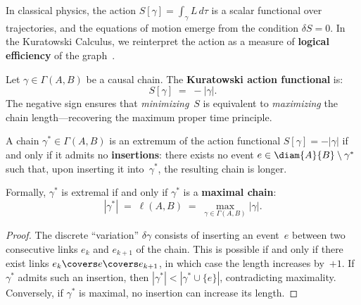 In classical physics, the action
$S[\gamma] = \int_\gamma L\,d\tau$ is a scalar functional over
trajectories, and the equations of motion emerge from the condition
$\delta S = 0$. In the Kuratowski Calculus, we reinterpret the action
as a measure of \textbf{logical efficiency} of the
graph~\cite{benincasa2010,benincasa2011,buck2015}.

\begin{definition}
\label{def:discrete-action}
Let $\gamma \in \Gamma(A,B)$ be a causal chain. The \textbf{Kuratowski
action functional} is:
\begin{equation}
  S[\gamma] \;=\; -|\gamma|.
  \label{eq:discrete-action}
\end{equation}
The negative sign ensures that \emph{minimizing}~$S$ is equivalent to
\emph{maximizing} the chain length---recovering the maximum proper
time principle.
\end{definition}


\begin{theorem}
\label{thm:extremal-condition}
A chain $\gamma^* \in \Gamma(A,B)$ is an extremum of the action
functional $S[\gamma] = -|\gamma|$ if and only if it admits no
\textbf{insertions}: there exists no event $e \in \diam{A}{B}
\setminus \gamma^*$ such that, upon inserting it into~$\gamma^*$, the
resulting chain is longer.

Formally, $\gamma^*$ is extremal if and only if $\gamma^*$ is a
\textbf{maximal chain}:
\begin{equation}
  |\gamma^*| \;=\; \ell(A,B)
  \;=\; \max_{\gamma \in \Gamma(A,B)} |\gamma|.
  \label{eq:extremal}
\end{equation}
\end{theorem}

\begin{proof}
The discrete ``variation'' $\delta\gamma$ consists of inserting an
event~$e$ between two consecutive links $e_k$ and $e_{k+1}$ of the
chain. This is possible if and only if there exist links
$e_k \covers e \covers e_{k+1}$, in which case the length increases
by~$+1$. If $\gamma^*$ admits such an insertion, then
$|\gamma^*| < |\gamma^* \cup \{e\}|$, contradicting maximality.
Conversely, if $\gamma^*$ is maximal, no insertion can increase its
length.
\end{proof}

